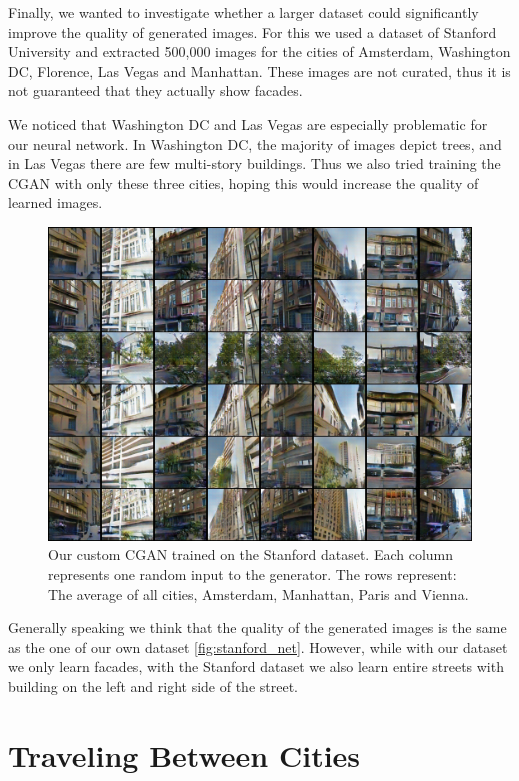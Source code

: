 \documentclass[a4paper]{article}
\begin{document}
Finally, we wanted to investigate whether a larger dataset could significantly improve the quality of generated images. For this we used a dataset of Stanford University \citep{pytorch_deep_2019} and extracted 500,000 images for the cities of Amsterdam, Washington DC, Florence, Las Vegas and Manhattan. These images are not curated, thus it is not guaranteed that they actually show facades. 

We noticed that Washington DC and Las Vegas are especially problematic for our neural network.
In Washington DC, the majority of images depict trees, and in Las Vegas there are few multi-story buildings.
Thus we also tried training the CGAN with only these three cities, hoping this would increase the quality of learned images.

\begin{figure}[h]
\includegraphics[width=\columnwidth]{figures/good_hack_stanford_dataset.png}
\caption{Our custom CGAN trained on the Stanford dataset. Each column represents one random input to the generator. The rows represent: The average of all cities, Amsterdam, Manhattan, Paris and Vienna.}
\label{fig:stanford_net}
\end{figure}

Generally speaking we think that the quality of the generated images is the same as the one of our own dataset \autoref{fig:stanford_net}. However, while with our dataset we only learn facades, with the Stanford dataset we also learn entire streets with building on the left and right side of the street. 

\section{Traveling Between Cities}
\end{document}
